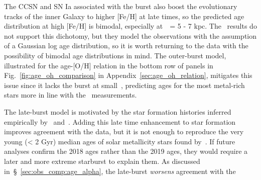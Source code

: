 \documentclass[draft2.tex]{subfiles}
\begin{document}
The CCSN and SN Ia associated with the burst also boost the evolutionary 
tracks of the inner Galaxy to higher [Fe/H] at late times, so the predicted 
age distribution at high [Fe/H] is bimodal, especially at~\rgal~= 5 - 7 kpc. 
The~\citet{Feuillet2019} results do not support this dichotomy, but they 
model the observations with the assumption of a Gaussian log age distribution, 
so it is worth returning to the data with the possibility of bimodal age 
distributions in mind. 
The outer-burst model, illustrated for the age-[O/H] relation in the bottom 
row of panels in Fig.~\ref{fig:age_oh_comparison} in 
Appendix~\ref{sec:age_oh_relation}, mitigates this issue since it lacks the 
burst at small~\rgal, predicting ages for the most metal-rich stars more in line 
with the~\citet{Feuillet2019} measurements. 
\par 
The late-burst model is motivated by the star formation histories inferred 
empirically by~\citet{Isern2019} and~\citet{Mor2019}. 
Adding this late time enhancement to star formation improves agreement with the 
\citet{Feuillet2019} data, but it is not enough to reproduce the very young 
(< 2 Gyr) median ages of solar metallicity stars found by~\citet{Feuillet2018}. 
If future analyses confirm the 2018 ages rather than the 2019 ages, they would 
require a later and more extreme starburst to explain them. 
As discussed in~\S~\ref{sec:obs_comp:age_alpha}, the late-burst 
\textit{worsens} agreement with the~\citet{Feuillet2018, Feuillet2019} 
\end{document}
